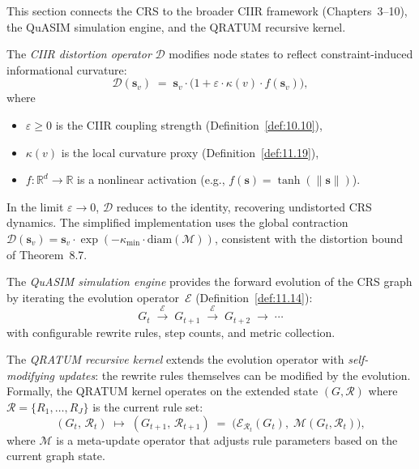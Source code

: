 This section connects the CRS to the broader CIIR framework
(Chapters~3--10), the QuASIM simulation engine, and the QRATUM
recursive kernel.

\begin{definition}
\label{def:11.36}
The \emph{CIIR distortion operator} $\mathcal{D}$ modifies node
states to reflect constraint-induced informational curvature:
\begin{equation}
\label{eq:11.distortion}
  \mathcal{D}(\mathbf{s}_v)
  \;=\;
  \mathbf{s}_v \cdot
  \bigl(1 + \varepsilon \cdot \kappa(v) \cdot f(\mathbf{s}_v)\bigr),
\end{equation}
where
\begin{itemize}
  \item $\varepsilon \geq 0$ is the CIIR coupling strength
        (Definition~\ref{def:10.10}),
  \item $\kappa(v)$ is the local curvature proxy
        (Definition~\ref{def:11.19}),
  \item $f \colon \mathbb{R}^d \to \mathbb{R}$ is a nonlinear
        activation (e.g., $f(\mathbf{s}) = \tanh(\|\mathbf{s}\|)$).
\end{itemize}
In the limit $\varepsilon \to 0$, $\mathcal{D}$ reduces to the
identity, recovering undistorted CRS dynamics.  The simplified
implementation uses the global contraction
$\mathcal{D}(\mathbf{s}_v) = \mathbf{s}_v \cdot
\exp(-\kappa_{\min} \cdot \mathrm{diam}(\mathcal{M}))$,
consistent with the distortion bound of Theorem~8.7.
\end{definition}

\begin{definition}
\label{def:11.37}
The \emph{QuASIM simulation engine} provides the forward evolution of
the CRS graph by iterating the evolution operator~$\mathcal{E}$
(Definition~\ref{def:11.14}):
\begin{equation}
\label{eq:11.quasim}
  G_t \;\xrightarrow{\mathcal{E}}\; G_{t+1}
  \;\xrightarrow{\mathcal{E}}\; G_{t+2}
  \;\to\; \cdots
\end{equation}
with configurable rewrite rules, step counts, and metric collection.
\end{definition}

\begin{definition}
\label{def:11.38}
The \emph{QRATUM recursive kernel} extends the evolution operator with
\emph{self-modifying updates}: the rewrite rules themselves can be
modified by the evolution.  Formally, the QRATUM kernel operates on
the extended state $(G, \mathcal{R})$ where
$\mathcal{R} = \{R_1, \ldots, R_J\}$ is the current rule set:
\begin{equation}
\label{eq:11.qratum}
  (G_t,\, \mathcal{R}_t)
  \;\longmapsto\;
  (G_{t+1},\, \mathcal{R}_{t+1})
  \;=\;
  \bigl(\mathcal{E}_{\mathcal{R}_t}(G_t),\;
        \mathcal{M}(G_t, \mathcal{R}_t)\bigr),
\end{equation}
where $\mathcal{M}$ is a meta-update operator that adjusts rule
parameters based on the current graph state.
\end{definition}

